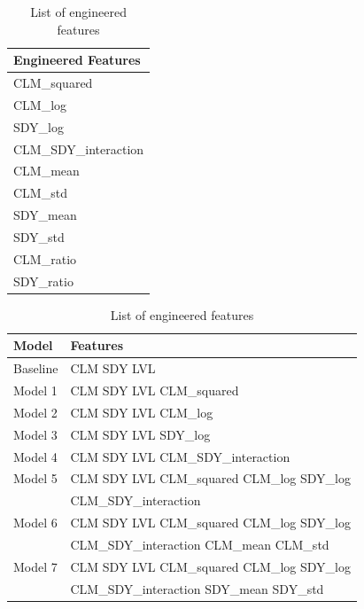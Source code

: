 \documentclass{article}
\begin{document}
\begin{table}[H]
\centering
\small
\begin{minipage}{0.45\textwidth}
    \centering
    \begin{adjustbox}{max width=\textwidth}
    \begin{tabular}{|l|}
    \hline
    \textbf{Engineered Features} \\
    \hline
    CLM\_squared \\
    CLM\_log \\
    SDY\_log \\
    CLM\_SDY\_interaction \\
    CLM\_mean \\
    CLM\_std \\
    SDY\_mean \\
    SDY\_std \\
    CLM\_ratio \\
    SDY\_ratio \\
    \hline
    \end{tabular}
    \end{adjustbox}
    \caption{List of engineered features}
    \label{ENGFEATURES}
\end{minipage}
\hfill
\begin{minipage}{0.45\textwidth}
    \centering
    \begin{adjustbox}{max width=\textwidth}
    \begin{tabular}{|l|l|}
    \hline
    \textbf{Model} & \textbf{Features} \\
    \hline
    Baseline & CLM SDY LVL \\
    \hline
    Model 1 & CLM SDY LVL CLM\_squared \\
    \hline
    Model 2 & CLM SDY LVL CLM\_log \\
    \hline
    Model 3 & CLM SDY LVL SDY\_log \\
    \hline
    Model 4 & CLM SDY LVL CLM\_SDY\_interaction \\
    \hline
    Model 5 & CLM SDY LVL CLM\_squared CLM\_log SDY\_log \\
            & CLM\_SDY\_interaction \\
    \hline
    Model 6 & CLM SDY LVL CLM\_squared CLM\_log SDY\_log \\
            & CLM\_SDY\_interaction CLM\_mean CLM\_std \\
    \hline
    Model 7 & CLM SDY LVL CLM\_squared CLM\_log SDY\_log \\
            & CLM\_SDY\_interaction SDY\_mean SDY\_std \\

\end{tabular}
\end{adjustbox}
\end{minipage}
\end{table}
\end{document}
